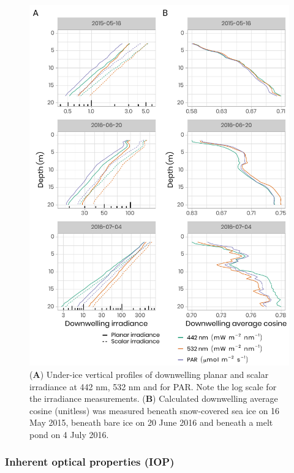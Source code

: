 \documentclass[essd, manuscript]{copernicus}
\begin{document}
\begin{figure}[H]
	\centering
	\includegraphics[scale = 1]{../../../../graphs/fig06.pdf}
	\caption{(\textbf{A}) Under-ice vertical profiles of downwelling planar and scalar irradiance at 442 nm, 532 nm and for PAR. Note the log scale for the irradiance measurements. (\textbf{B}) Calculated downwelling average cosine (unitless) was measured beneath snow-covered sea ice on 16 May 2015, beneath bare ice on 20 June 2016 and beneath a melt pond on 4 July 2016.}
\end{figure}

\subsubsection{Inherent optical properties (IOP)}
\end{document}
